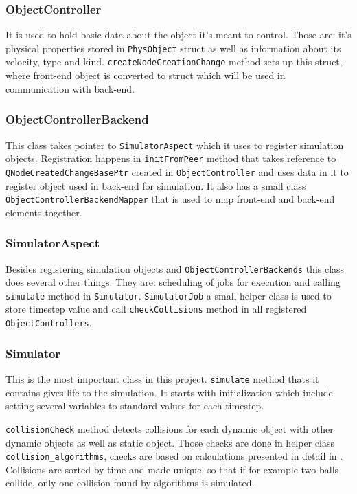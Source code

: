 \documentclass[a4,10pt]{article}
\begin{document}
\subsubsection{ObjectController}
It is used to hold basic data about the object it's meant to control. Those are: it's physical properties stored in \verb|PhysObject| struct as well as information about its velocity, type and kind. \verb|createNodeCreationChange| method sets up this struct, where front-end object is converted to struct which will be used in communication with back-end. 

\subsubsection{ObjectControllerBackend}
This class takes pointer to \verb|SimulatorAspect| which it uses to register simulation objects. Registration happens in \verb|initFromPeer| method that takes reference to \verb|QNodeCreatedChangeBasePtr| created in \verb|ObjectController| and uses data in it to register object used in back-end for simulation. It also has a small class \verb|ObjectControllerBackendMapper| that is used to map front-end and back-end elements together.

\subsubsection{SimulatorAspect}
Besides registering simulation objects and \verb|ObjectControllerBackends| this class does several other things. They are: scheduling of jobs for execution and calling \verb|simulate| method in \verb|Simulator|. \verb|SimulatorJob| a small helper class is used to store timestep value and call \verb|checkCollisions| method in all registered \verb|ObjectControllers|.

\subsubsection{Simulator}
This is the most important class in this project. \verb|simulate| method thats it contains gives life to the simulation. It starts with initialization which include setting several variables to standard values for each timestep. 

\verb|collisionCheck| method detects collisions for each dynamic object with other dynamic objects as well as static object. Those checks are done in helper class \verb|collision_algorithms|, checks are based on calculations presented in detail in \cite{bratlie_dalmo_laksaa_brustad_2017}. Collisions are sorted by time and made unique, so that if for example two balls collide, only one collision found by algorithms is simulated.
\end{document}
